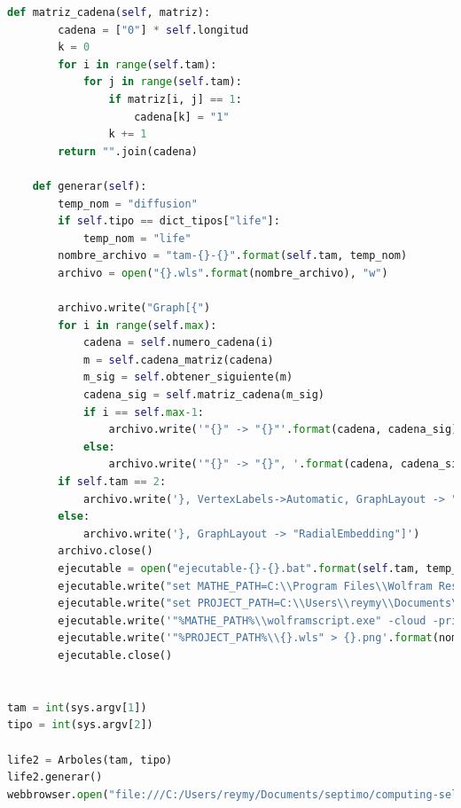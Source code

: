 \begin{lstlisting}[language=Python]
    def matriz_cadena(self, matriz):
        cadena = ["0"] * self.longitud
        k = 0
        for i in range(self.tam):
            for j in range(self.tam):
                if matriz[i, j] == 1:
                    cadena[k] = "1"
                k += 1
        return "".join(cadena)

    def generar(self):
        temp_nom = "diffusion"
        if self.tipo == dict_tipos["life"]:
            temp_nom = "life"
        nombre_archivo = "tam-{}-{}".format(self.tam, temp_nom)
        archivo = open("{}.wls".format(nombre_archivo), "w")

        archivo.write("Graph[{")
        for i in range(self.max):
            cadena = self.numero_cadena(i)
            m = self.cadena_matriz(cadena)
            m_sig = self.obtener_siguiente(m)
            cadena_sig = self.matriz_cadena(m_sig)
            if i == self.max-1:
                archivo.write('"{}" -> "{}"'.format(cadena, cadena_sig))
            else:
                archivo.write('"{}" -> "{}", '.format(cadena, cadena_sig))
        if self.tam == 2:
            archivo.write('}, VertexLabels->Automatic, GraphLayout -> "RadialEmbedding"]')
        else:
            archivo.write('}, GraphLayout -> "RadialEmbedding"]')
        archivo.close()
        ejecutable = open("ejecutable-{}-{}.bat".format(self.tam, temp_nom), "w")
        ejecutable.write("set MATHE_PATH=C:\\Program Files\\Wolfram Research\\Mathematica\\11.3\n")
        ejecutable.write("set PROJECT_PATH=C:\\Users\\reymy\\Documents\\septimo\\computing-selected-topics\\arboles\n")
        ejecutable.write('"%MATHE_PATH%\\wolframscript.exe" -cloud -print -format PNG -file ')
        ejecutable.write('"%PROJECT_PATH%\\{}.wls" > {}.png'.format(nombre_archivo, nombre_archivo))
        ejecutable.close()


tam = int(sys.argv[1])
tipo = int(sys.argv[2])

life2 = Arboles(tam, tipo)
life2.generar()
webbrowser.open("file:///C:/Users/reymy/Documents/septimo/computing-selected-topics/arboles/index.html")

\end{lstlisting}

